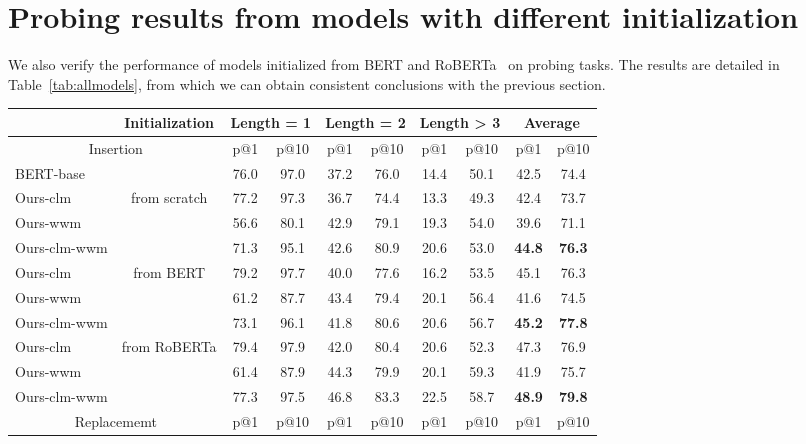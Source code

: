 \documentclass[11pt]{article}
\begin{document}
\section{Probing results from models with different initialization}\label{diffmodels}
We also verify the performance of models initialized from BERT \cite{devlin2018bert} and RoBERTa~\cite{cui2019pre} on probing tasks. The results are detailed in Table~\ref{tab:allmodels}, from which we can obtain consistent conclusions with the previous section.
\begin{table*}[ht]
  \centering
    \begin{tabular}{l|c|cc|cc|cc|cc}
    \toprule
          & Initialization & \multicolumn{2}{c|}{Length = 1} & \multicolumn{2}{c|}{Length = 2} & \multicolumn{2}{c|}{Length > 3} & \multicolumn{2}{c}{Average} \\
    \midrule
    \multicolumn{2}{c|}{Insertion} & p@1   & p@10  & p@1   & p@10  & p@1   & p@10  & p@1   & p@10  \\
    \midrule
    BERT-base &       & 76.0    & 97.0    & 37.2  & 76.0    & 14.4  & 50.1  & 42.5  & 74.4 \\
    \midrule
    Ours-clm & \multirow{3}[2]{*}{from scratch} & 77.2  & 97.3  & 36.7  & 74.4  & 13.3  & 49.3  & 42.4  & 73.7 \\
    Ours-wwm &       & 56.6  & 80.1  & 42.9  & 79.1  & 19.3  & 54.0    & 39.6  & 71.1 \\
    Ours-clm-wwm &       & 71.3  & 95.1  & 42.6  & 80.9  & 20.6  & 53.0    & \textbf{44.8}  & \textbf{76.3} \\
    \midrule
    Ours-clm & \multirow{3}[1]{*}{from BERT} & 79.2  & 97.7  & 40.0    & 77.6  & 16.2  & 53.5  & 45.1  & 76.3 \\
    Ours-wwm &       & 61.2  & 87.7  & 43.4  & 79.4  & 20.1  & 56.4  & 41.6  & 74.5 \\
    Ours-clm-wwm &       & 73.1  & 96.1  & 41.8  & 80.6  & 20.6  & 56.7  & \textbf{45.2}  & \textbf{77.8} \\
    \midrule
    Ours-clm & \multirow{3}[1]{*}{from RoBERTa} & 79.4  & 97.9  & 42.0    & 80.4  & 20.6  & 52.3  & 47.3  & 76.9 \\
    Ours-wwm &       & 61.4  & 87.9  & 44.3  & 79.9  & 20.1  & 59.3  & 41.9  & 75.7 \\
    Ours-clm-wwm &       & 77.3  & 97.5  & 46.8  & 83.3  & 22.5  & 58.7  & \textbf{48.9}  & \textbf{79.8} \\
    \midrule
    \multicolumn{2}{c|}{Replacememt} & p@1   & p@10  & p@1   & p@10  & p@1   & p@10  & p@1   & p@10  \\

\end{tabular}
\end{table*}
\end{document}
